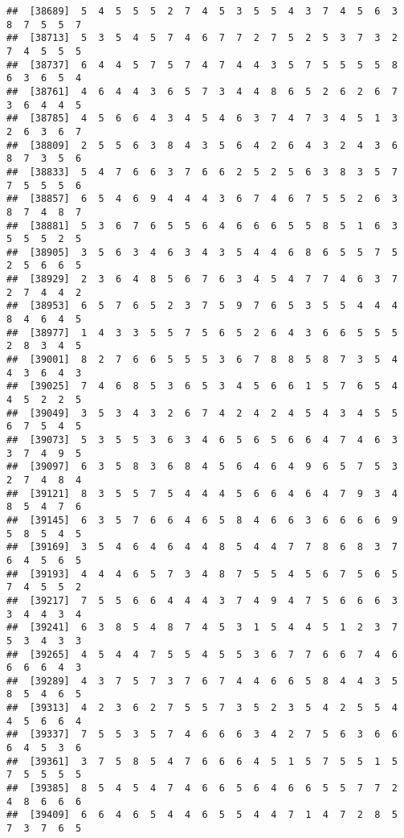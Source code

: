 \documentclass[
]{book}
\begin{document}
\begin{verbatim}
##  [38689]  5  4  5  5  5  2  7  4  5  3  5  5  4  3  7  4  5  6  3  8  7  5  5  7
##  [38713]  5  3  5  4  5  7  4  6  7  7  2  7  5  2  5  3  7  3  2  7  4  5  5  5
##  [38737]  6  4  4  5  7  5  7  4  7  4  4  3  5  7  5  5  5  5  8  6  3  6  5  4
##  [38761]  4  6  4  4  3  6  5  7  3  4  4  8  6  5  2  6  2  6  7  3  6  4  4  5
##  [38785]  4  5  6  6  4  3  4  5  4  6  3  7  4  7  3  4  5  1  3  2  6  3  6  7
##  [38809]  2  5  5  6  3  8  4  3  5  6  4  2  6  4  3  2  4  3  6  8  7  3  5  6
##  [38833]  5  4  7  6  6  3  7  6  6  2  5  2  5  6  3  8  3  5  7  7  5  5  5  6
##  [38857]  6  5  4  6  9  4  4  4  3  6  7  4  6  7  5  5  2  6  3  8  7  4  8  7
##  [38881]  5  3  6  7  6  5  5  6  4  6  6  6  5  5  8  5  1  6  3  5  5  5  2  5
##  [38905]  3  5  6  3  4  6  3  4  3  5  4  4  6  8  6  5  5  7  5  2  5  6  6  5
##  [38929]  2  3  6  4  8  5  6  7  6  3  4  5  4  7  7  4  6  3  7  2  7  4  4  2
##  [38953]  6  5  7  6  5  2  3  7  5  9  7  6  5  3  5  5  4  4  4  8  4  6  4  5
##  [38977]  1  4  3  3  5  5  7  5  6  5  2  6  4  3  6  6  5  5  5  2  8  3  4  5
##  [39001]  8  2  7  6  6  5  5  5  3  6  7  8  8  5  8  7  3  5  4  4  3  6  4  3
##  [39025]  7  4  6  8  5  3  6  5  3  4  5  6  6  1  5  7  6  5  4  4  5  2  2  5
##  [39049]  3  5  3  4  3  2  6  7  4  2  4  2  4  5  4  3  4  5  5  6  7  5  4  5
##  [39073]  5  3  5  5  3  6  3  4  6  5  6  5  6  6  4  7  4  6  3  3  7  4  9  5
##  [39097]  6  3  5  8  3  6  8  4  5  6  4  6  4  9  6  5  7  5  3  2  7  4  8  4
##  [39121]  8  3  5  5  7  5  4  4  4  5  6  6  4  6  4  7  9  3  4  8  5  4  7  6
##  [39145]  6  3  5  7  6  6  4  6  5  8  4  6  6  3  6  6  6  6  9  5  8  5  4  5
##  [39169]  3  5  4  6  4  6  4  4  8  5  4  4  7  7  8  6  8  3  7  6  4  5  6  5
##  [39193]  4  4  4  6  5  7  3  4  8  7  5  5  4  5  6  7  5  6  5  7  4  5  5  2
##  [39217]  7  5  5  6  6  4  4  4  3  7  4  9  4  7  5  6  6  6  3  3  4  4  3  4
##  [39241]  6  3  8  5  4  8  7  4  5  3  1  5  4  4  5  1  2  3  7  5  3  4  3  3
##  [39265]  4  5  4  4  7  5  5  4  5  5  3  6  7  7  6  6  7  4  6  6  6  6  4  3
##  [39289]  4  3  7  5  7  3  7  6  7  4  4  6  6  5  8  4  4  3  5  8  5  4  6  5
##  [39313]  4  2  3  6  2  7  5  5  7  3  5  2  3  5  4  2  5  5  4  4  5  6  6  4
##  [39337]  7  5  5  3  5  7  4  6  6  6  3  4  2  7  5  6  3  6  6  6  4  5  3  6
##  [39361]  3  7  5  8  5  4  7  6  6  6  4  5  1  5  7  5  5  1  5  7  5  5  5  5
##  [39385]  8  5  4  5  4  7  4  6  6  5  6  4  6  6  5  5  7  7  2  4  8  6  6  6
##  [39409]  6  6  4  6  5  4  4  6  5  5  4  4  7  1  4  7  2  8  5  7  3  7  6  5

\end{verbatim}
\end{document}
